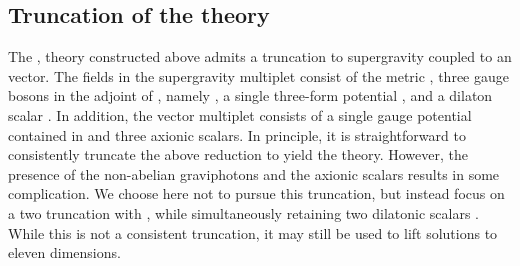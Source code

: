 \documentclass[a4paper,12pt]{article}
\providecommand{\fft}[2]{{\frac{#1}{#2}}}
\begin{document}
\subsection{Truncation of the \coordHE{} theory}

The \coordHE{}, \coordHE{} theory constructed above admits a truncation to \coordHE{}
supergravity coupled to an \coordHE{} vector.  The fields in the supergravity
multiplet consist of the metric \coordHE{}, three gauge bosons in the
adjoint of \coordHE{}, namely
\myHighlight{$\hat A_{(1)}^{\overline{ij}}+\fft12\epsilon^{\overline{ijkl}}
\hat A_{(1)}^{\overline{kl}}$}\coordHE{}, a single three-form potential \coordHE{}, and a dilaton scalar \myHighlight{$\varphi$}\coordHE{}.  In addition, the vector
multiplet consists of a single \coordHE{} gauge potential contained in
\coordHE{} and three axionic scalars.
In principle, it is straightforward to consistently truncate the above
reduction to yield the \coordHE{} theory.  However, the presence of the
non-abelian graviphotons and the axionic scalars results in some
complication.  We choose here not to pursue this truncation, but instead
focus on a two \coordHE{} truncation with \coordHE{}, while
simultaneously retaining two dilatonic scalars \cite{Cvetic}.  While
this is not a consistent truncation, it may still be used to lift
solutions to eleven dimensions.
\end{document}
